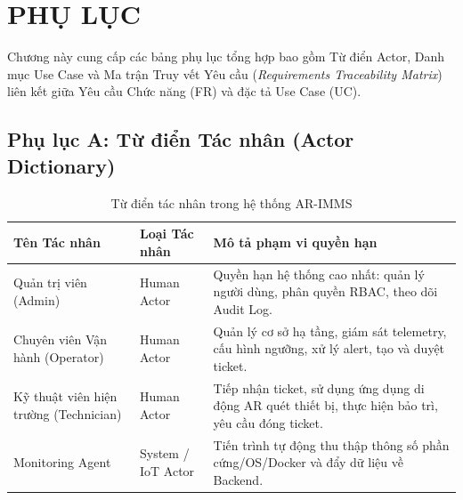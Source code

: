 \chapter{PHỤ LỤC}

Chương này cung cấp các bảng phụ lục tổng hợp bao gồm Từ điển Actor, Danh mục Use Case và Ma trận Truy vết Yêu cầu (\textit{Requirements Traceability Matrix}) liên kết giữa Yêu cầu Chức năng (FR) và đặc tả Use Case (UC).

\section{Phụ lục A: Từ điển Tác nhân (Actor Dictionary)}
\begin{table}[H]
\centering
\begin{tabular}{|p{3.5cm}|p{3.5cm}|p{7.5cm}|}
\hline
\textbf{Tên Tác nhân} & \textbf{Loại Tác nhân} & \textbf{Mô tả phạm vi quyền hạn} \\ \hline
Quản trị viên (Admin) & Human Actor & Quyền hạn hệ thống cao nhất: quản lý người dùng, phân quyền RBAC, theo dõi Audit Log. \\ \hline
Chuyên viên Vận hành (Operator) & Human Actor & Quản lý cơ sở hạ tầng, giám sát telemetry, cấu hình ngưỡng, xử lý alert, tạo và duyệt ticket. \\ \hline
Kỹ thuật viên hiện trường (Technician) & Human Actor & Tiếp nhận ticket, sử dụng ứng dụng di động AR quét thiết bị, thực hiện bảo trì, yêu cầu đóng ticket. \\ \hline
Monitoring Agent & System / IoT Actor & Tiến trình tự động thu thập thông số phần cứng/OS/Docker và đẩy dữ liệu về Backend. \\ \hline
\end{tabular}
\caption{Từ điển tác nhân trong hệ thống AR-IMMS}
\end{table}

